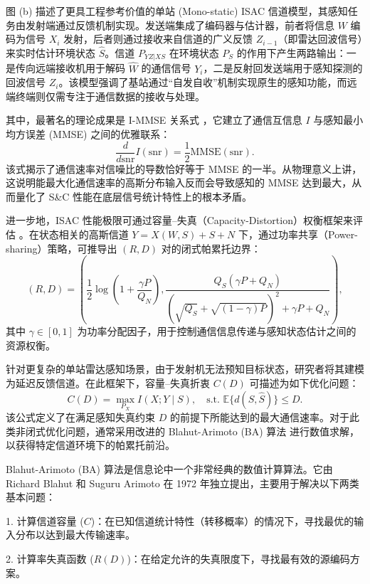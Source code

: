 图 (b) 描述了更具工程参考价值的单站 (Mono-static) ISAC 信道模型，其感知任务由发射端通过反馈机制实现。发送端集成了编码器与估计器，前者将信息 $W$ 编码为信号 $X_i$ 发射，后者则通过接收来自信道的广义反馈 $Z_{i-1}$（即雷达回波信号）来实时估计环境状态 $\hat{S}$。信道 $P_{YZ|XS}$ 在环境状态 $P_S$ 的作用下产生两路输出：一是传向远端接收机用于解码 $\hat{W}$ 的通信信号 $Y_i$，二是反射回发送端用于感知探测的回波信号 $Z_i$。该模型强调了基站通过“自发自收”机制实现原生的感知功能，而远端终端则仅需专注于通信数据的接收与处理。

\qquad

其中，最著名的理论成果是 I-MMSE 关系式 \cite{1412024}，它建立了通信互信息 $I$ 与感知最小均方误差 (MMSE) 之间的优雅联系：
\begin{equation}
	\frac{d}{d\mathrm{snr}} I(\mathrm{snr}) = \frac{1}{2} \mathrm{MMSE}(\mathrm{snr}). \label{eq:1}
\end{equation}
该式揭示了通信速率对信噪比的导数恰好等于 MMSE 的一半。从物理意义上讲，这说明能最大化通信速率的高斯分布输入反而会导致感知的 MMSE 达到最大，从而量化了 S\&C 性能在底层信号统计特性上的根本矛盾。

进一步地，ISAC 性能极限可通过容量--失真（Capacity-Distortion）权衡框架来评估 \cite{936166}。在状态相关的高斯信道 $Y = X(W, S) + S + N$ 下，通过功率共享（Power-sharing）策略，可推导出 $(R, D)$ 对的闭式帕累托边界：
\begin{equation}
	(R, D) = \left( \frac{1}{2} \log \left( 1 + \frac{\gamma P}{Q_N} \right), \frac{Q_S ( \gamma P + Q_N )}{ ( \sqrt{Q_S} + \sqrt{(1-\gamma)P} )^2 + \gamma P + Q_N } \right), \label{eq:6}
\end{equation}
其中 $\gamma \in [0, 1]$ 为功率分配因子，用于控制通信信息传递与感知状态估计之间的资源权衡。

针对更复杂的单站雷达感知场景，由于发射机无法预知目标状态，研究者将其建模为延迟反馈信道。在此框架下，容量--失真折衷 $C(D)$ 可描述为如下优化问题：
\begin{equation}
	C(D) = \max_{P_X} I(X; Y \mid S), \quad \text{s.t. } \mathbb{E} \{ d(S, \hat{S}) \} \leq D. \label{eq:8}
\end{equation}
该公式定义了在满足感知失真约束 $D$ 的前提下所能达到的最大通信速率。对于此类非闭式优化问题，通常采用改进的 Blahut-Arimoto (BA) 算法 \cite{8437621}进行数值求解，以获得特定信道环境下的帕累托前沿。

Blahut-Arimoto (BA) 算法是信息论中一个非常经典的数值计算算法。它由 Richard Blahut 和 Suguru Arimoto 在 1972 年独立提出，主要用于解决以下两类基本问题：

1. 计算信道容量 ($C$)：在已知信道统计特性（转移概率）的情况下，寻找最优的输入分布以达到最大传输速率。

2. 计算率失真函数 ($R(D)$)：在给定允许的失真限度下，寻找最有效的源编码方案。

